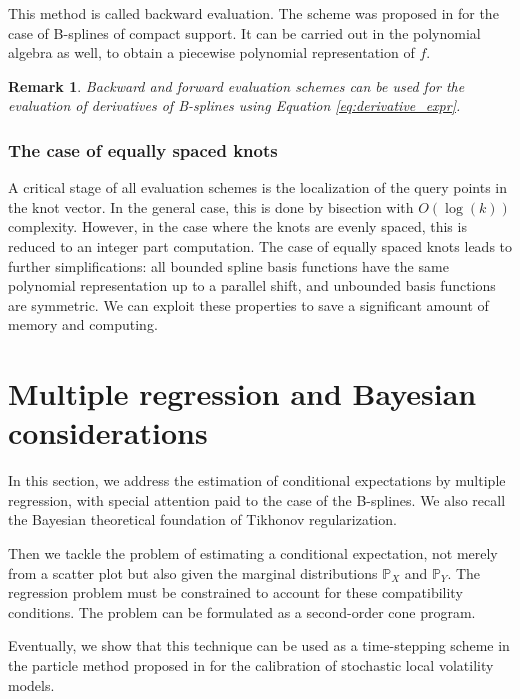 \documentclass[a4paper]{article}
\newtheorem*{remark}{Remark}
\newcommand{\1}{\textbf{1}}
\newcommand{\PP}{\mathbb{P}}
\begin{document}
\par \noindent This method is called backward evaluation. The scheme was proposed in \cite[Chapter $5$]{SchumakerSplineBook} for the case of B-splines of compact support. It can be carried out in the polynomial algebra as well, to obtain a piecewise polynomial representation of $f$.
\begin{remark}
Backward and forward evaluation schemes can be used for the evaluation of derivatives of B-splines using Equation \eqref{eq:derivative_expr}. 
\end{remark}
\subsubsection*{The case of equally spaced knots}
\par A critical stage of all evaluation schemes is the localization of the query points in the knot vector. In the general case, this is done by bisection with $O\left(\log(k)\right)$ complexity. However, in the case where the knots are evenly spaced, this is reduced to an integer part computation. 
The case of equally spaced knots leads to further simplifications: all bounded spline basis functions have the same polynomial representation up to a parallel shift, and unbounded basis functions are symmetric. We can exploit these properties to save a significant amount of memory and computing. 
\section{Multiple regression and Bayesian considerations}\label{sec:multiple_regression}
\par In this section, we address the estimation of conditional expectations by multiple regression, with special attention paid to the case of the B-splines. We also recall the Bayesian theoretical foundation of Tikhonov regularization. 
\par Then we tackle the problem of estimating a conditional expectation, not merely from a scatter plot but also given the marginal distributions $\PP_X$ and $\PP_Y$. The regression problem must be constrained to account for these compatibility conditions. The problem can be formulated as a second-order cone program.
\par Eventually, we show that this technique can be used as a time-stepping scheme in the particle method proposed in \cite{GuyonLabordereParticular} for the calibration of stochastic local volatility models. 
\end{document}
